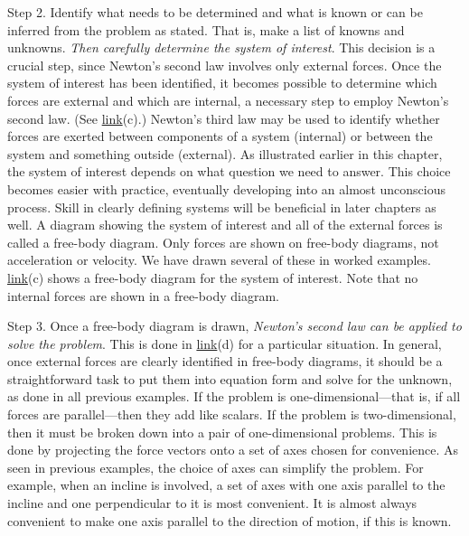 \documentclass[
]{book}
\begin{document}
Step 2. Identify what needs to be determined and what is known or can be
inferred from the problem as stated. That is, make a list of knowns and
unknowns. \emph{Then carefully determine the system of interest}. This
decision is a crucial step, since Newton's second law involves only
external forces. Once the system of interest has been identified, it
becomes possible to determine which forces are external and which are
internal, a necessary step to employ Newton's second law. (See
\protect\hyperlink{import-auto-id1669409}{link}(c).) Newton's
third law may be used to identify whether forces are exerted between
components of a system (internal) or between the system and something
outside (external). As illustrated earlier in this chapter, the system
of interest depends on what question we need to answer. This choice
becomes easier with practice, eventually developing into an almost
unconscious process. Skill in clearly defining systems will be
beneficial in later chapters as well. {\hfill\break
}{\hfill\break
}A diagram showing the system of interest and all
of the external forces is called a \protect\hypertarget{import-auto-id1606094}{}{free-body
diagram}. Only forces are shown
on free-body diagrams, not acceleration or velocity. We have drawn
several of these in worked examples.
\protect\hyperlink{import-auto-id1669409}{link}(c) shows a
free-body diagram for the system of interest. Note that no internal
forces are shown in a free-body diagram.

Step 3. Once a free-body diagram is drawn, \emph{Newton's second law can be
applied to solve the problem}. This is done in
\protect\hyperlink{import-auto-id1669409}{link}(d) for a
particular situation. In general, once external forces are clearly
identified in free-body diagrams, it should be a straightforward task to
put them into equation form and solve for the unknown, as done in all
previous examples. If the problem is one-dimensional---that is, if all
forces are parallel---then they add like scalars. If the problem is
two-dimensional, then it must be broken down into a pair of
one-dimensional problems. This is done by projecting the force vectors
onto a set of axes chosen for convenience. As seen in previous examples,
the choice of axes can simplify the problem. For example, when an
incline is involved, a set of axes with one axis parallel to the incline
and one perpendicular to it is most convenient. It is almost always
convenient to make one axis parallel to the direction of motion, if this
is known.
\end{document}
